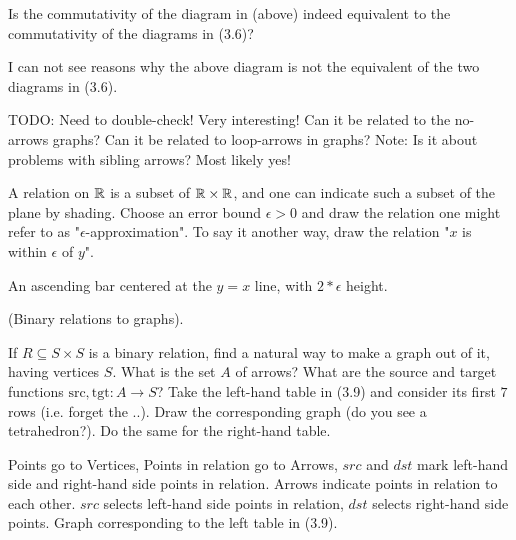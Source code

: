 \documentclass{article}
\begin{document}
Is the commutativity of the diagram in (above) indeed equivalent to the
commutativity of the diagrams in (3.6)?

\ans

I can not see reasons why the above diagram is not the equivalent of the two
diagrams in (3.6).

TODO: Need to double-check! Very interesting! Can it be related to the no-arrows
graphs? Can it be related to loop-arrows in graphs? Note: Is it about problems
with sibling arrows? Most likely yes!



A relation on $\mathbb{R}$ is a subset of $\mathbb{R} \times \mathbb{R}$, and one can indicate
such a subset of the plane by shading. Choose an error bound $\epsilon > 0$ and
draw the relation one might refer to as "$\epsilon$-approximation". To say it
another way, draw the relation "$x$ is within $\epsilon$ of $y$".

\ans

An ascending bar centered at the $y=x$ line, with $2*\epsilon$ height.

 (Binary relations to graphs).

\es If $R \subseteq S \times S$ is a binary relation, find a natural way to make
    a graph out of it, having vertices $S$.
\ei What is the set $A$ of arrows?
\ei What are the source and target functions $\text{src}, \text{tgt} : A \to S$?
\ei Take the left-hand table in (3.9) and consider its first $7$ rows (i.e.
    forget the $..$). Draw the corresponding graph (do you see a tetrahedron?).
\ei Do the same for the right-hand table.
\ee

\ans

\es Points go to Vertices, Points in relation go to Arrows, $src$ and $dst$ mark
    left-hand side and right-hand side points in relation.
\ei Arrows indicate points in relation to each other.
\ei $src$ selects left-hand side points in relation, $dst$ selects right-hand
    side points.
\li Graph corresponding to the left table in (3.9).
\end{document}
